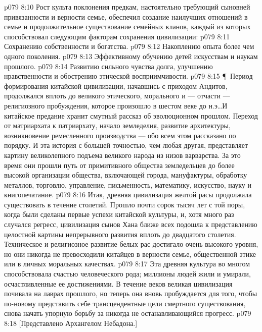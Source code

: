 \vs p079 8:10 Рост культа поклонения предкам, настоятельно требующий сыновней привязанности и верности семье, обеспечил создание наилучших отношений в семье и продолжительное существование семейных кланов, каждый из которых способствовал следующим факторам сохранения цивилизации:
\vs p079 8:11 \bibnobreakspace Сохранению собственности и богатства.
\vs p079 8:12 \bibnobreakspace Накоплению опыта более чем одного поколения.
\vs p079 8:13 \bibnobreakspace Эффективному обучению детей искусствам и наукам прошлого.
\vs p079 8:14 \bibnobreakspace Развитию сильного чувства долга, улучшению нравственности и обострению этической восприимчивости.
\vs p079 8:15 \P\ Период формирования китайской цивилизации, начавшись с приходом Андитов, продолжался вплоть до великого этического, морального и --- отчасти --- религиозного пробуждения, которое произошло в шестом веке до н.э\ldots  И китайское предание хранит смутный рассказ об эволюционном прошлом. Переход от матриархата к патриархату, начало земледелия, развитие архитектуры, возникновение ремесленного производства --- обо всем этом рассказано по порядку. И эта история с большей точностью, чем любая другая, представляет картину великолепного подъема великого народа из низов варварства. За это время они прошли путь от примитивного общества земледельцев до более высокой организации общества, включающей города, мануфактуры, обработку металлов, торговлю, управление, письменность, математику, искусство, науку и книгопечатание.
\vs p079 8:16 Итак, древняя цивилизация желтой расы продолжала существовать в течение столетий. Прошло почти сорок тысяч лет с той поры, когда были сделаны первые успехи китайской культуры, и, хотя много раз случался регресс, цивилизация сынов Хана ближе всех подошла к представлению целостной картины непрерывного развития вплоть до двадцатого столетия. Техническое и религиозное развитие белых рас достигало очень высокого уровня, но они никогда не превосходили китайцев в верности семье, общественной этике или в личных моральных качествах.
\vs p079 8:17 Эта древняя культура во многом способствовала счастью человеческого рода; миллионы людей жили и умирали, осчастливленные ее достижениями. В течение веков великая цивилизация почивала на лаврах прошлого, но теперь она вновь пробуждается для того, чтобы по\hyp{}новому представить себе трансцендентные цели смертного существования, снова начать упорную борьбу за никогда не останавливающийся прогресс.
\vs p079 8:18 [Представлено Архангелом Небадона.]
